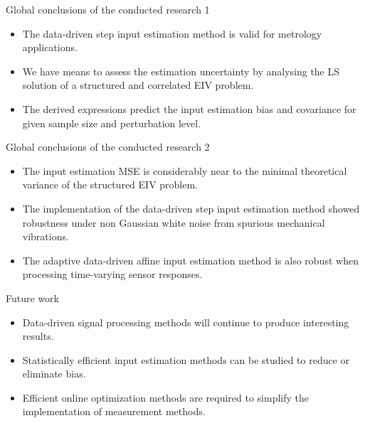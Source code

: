 \documentclass[presentation]{beamer}
\begin{document}
\begin{frame}[label={slide:conclusions}]{Global conclusions of the conducted research 1}
\begin{itemize}
\item  The data-driven step input estimation method is valid for metrology applications.
\item We have means to assess the estimation uncertainty by analysing the LS solution of a structured and correlated EIV problem.
\item The derived expressions predict the input estimation bias and covariance for given sample size and perturbation level.
\end{itemize}
\end{frame}

\begin{frame}[label={slide:conclusions}]{Global conclusions of the conducted research 2}
\begin{itemize}
\item The input estimation MSE is considerably near to the minimal theoretical variance of the structured EIV problem.
\item The implementation of the data-driven step input estimation method showed robustness under non Gaussian white noise from spurious mechanical vibrations. 
\item The adaptive data-driven affine input estimation method is also robust when processing time-varying sensor responses.
\end{itemize}
\end{frame}

\begin{frame}[label={slide:conclusions}]{Future work}
\begin{itemize}
\item Data-driven signal processing methods will continue to produce interesting results.
\item Statistically efficient input estimation methods can be studied to reduce or eliminate bias.
\item Efficient online optimization methods are required to simplify the  implementation of measurement methods.   
\end{itemize}
\end{frame}
\end{document}
